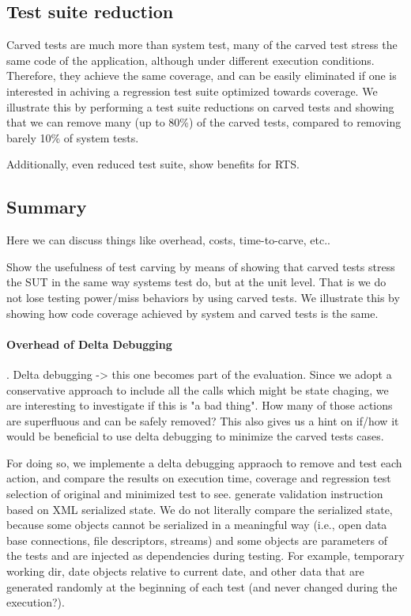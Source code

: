\documentclass[10pt,conference]{IEEEtran}
\begin{document}
\subsection{Test suite reduction}
Carved tests are much more than system test, many of the carved test stress the same code of the application, although under different execution conditions. Therefore, they achieve the same coverage, and can be easily eliminated if one is interested in achiving a regression test suite optimized towards coverage.
%
We illustrate this by performing a test suite reductions on carved tests and showing that we can remove many (up to 80\%) of the carved tests, compared to removing barely 10\% of system tests.

Additionally, even reduced test suite, show benefits for RTS.


\subsection{Summary}
Here we can discuss things like overhead, costs, time-to-carve, etc..


Show the usefulness of test carving by means of showing that 
carved tests stress the SUT in the same way systems test do, but at the unit level. 
That is we do not lose testing power/miss behaviors by using carved tests.
%
We illustrate this by showing how code coverage achieved by system and carved tests is the same.


\paragraph{Overhead of Delta Debugging}.
Delta debugging -> this one becomes part of the evaluation. Since we adopt a conservative approach to include all the calls which might be state chaging,
we are interesting to investigate if this is "a bad thing". How many of those actions are superfluous and can be safely removed?
This also gives us a hint on if/how it would be beneficial to use delta debugging to minimize the carved tests cases.

For doing so, we implemente a delta debugging appraoch to remove and test each action, and compare the results on execution time, coverage and regression test selection of original and minimized test to see.
	generate validation instruction based on XML serialized state. We do not literally compare the serialized state, because some objects cannot be serialized in a meaningful way (i.e., open data base connections, file descriptors, streams) and some objects are parameters of the tests and are injected as dependencies during testing. For example, temporary working dir, date objects relative to current date, and other data that are generated randomly at the beginning of each test (and never changed during the execution?). 
	
\end{document}
